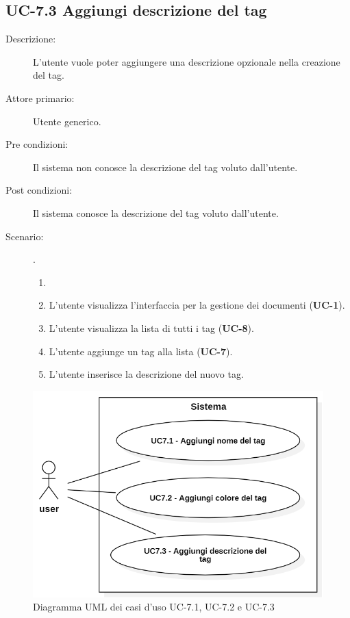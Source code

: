 \subsection{UC-7.3 Aggiungi descrizione del tag}
\begin{description}
    \item[Descrizione:] L’utente vuole poter aggiungere una descrizione opzionale nella creazione del tag.
    \item[Attore primario:] Utente generico.
    \item[Pre condizioni:] Il sistema non conosce la descrizione  del tag voluto dall’utente.
    \item[Post condizioni:] Il sistema conosce la descrizione del tag voluto dall’utente.
    \item[Scenario:].
    \begin{enumerate}
        \item[] 
        \item L’utente visualizza l'interfaccia per la gestione dei documenti (\textbf{UC-1}).
        \item L’utente visualizza la lista di tutti i tag (\textbf{UC-8}).
        \item L'utente aggiunge un tag alla lista (\textbf{UC-7}).
        \item L'utente inserisce la descrizione del nuovo tag.
    \end{enumerate}
\end{description}
\begin{figure}[H]
    \centering
    \includegraphics[width=0.8\linewidth]{UC7.1-2-3.PNG}
    \caption{Diagramma UML dei casi d'uso UC-7.1, UC-7.2 e UC-7.3}
    \label{fig:UC7.1-2-3}
\end{figure}

